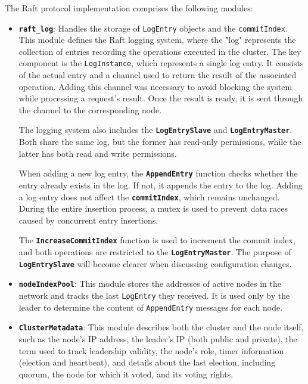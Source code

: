 The Raft protocol implementation comprises the following modules:
\begin{itemize}
  \item \textbf{\texttt{raft\_log}}:
    Handles the storage of \texttt{LogEntry} objects and the \texttt{commitIndex}.
    This module defines the Raft logging system, where the "log" represents the 
    collection of entries recording the operations executed in the cluster. The key 
    component is the \texttt{LogInstance}, which represents a single log entry. It consists 
    of the actual entry and a channel used to return the result of the associated 
    operation. Adding this channel was necessary to avoid blocking the system while 
    processing a request's result. Once the result is ready, it is sent through the 
    channel to the corresponding node.

    The logging system also includes the \textbf{\texttt{LogEntrySlave}} and \textbf{\texttt{LogEntryMaster}}. Both share
    the same log, but the former has read-only permissions, while the latter has 
    both read and write permissions.

    When adding a new log entry, the \textbf{\texttt{AppendEntry}} function checks whether the entry
    already exists in the log. If not, it appends the entry to the log. Adding a 
    log entry does not affect the \textbf{\texttt{commitIndex}}, which remains unchanged. During 
    the entire insertion process, a mutex is used to prevent data races caused 
    by concurrent entry insertions.
    
    The \texttt{\textbf{IncreaseCommitIndex}} function is used to increment the commit index, and 
    both operations are restricted to the \textbf{\texttt{LogEntryMaster}}. The purpose of \textbf{\texttt{LogEntrySlave}}
    will become clearer when discussing configuration changes.

  \item \textbf{\texttt{nodeIndexPool}}: This module stores the addresses of active nodes in the network 
    and tracks the last \texttt{LogEntry} they received. It is used only by the leader to determine 
    the content of \texttt{AppendEntry} messages for each node.

  \item \textbf{\texttt{ClusterMetadata}}: This module describes both the cluster and the node itself, 
    such as the node's IP address, the leader's IP (both public and private), the term used
    to track leadership validity, the node's role, timer information (election and heartbeat),
    and details about the last election, including quorum, the node for which it voted, 
    and its voting rights.


\end{itemize}
